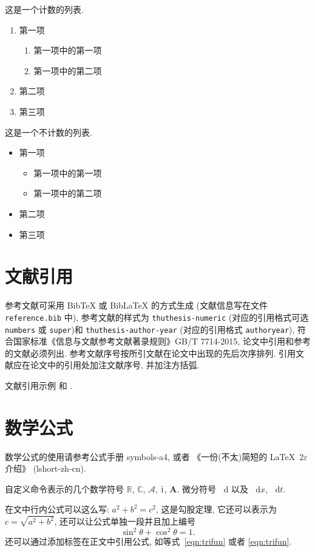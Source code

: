 \documentclass[UTF8,openany,twoside,12pt]{ctexbook}
\theoremstyle{plain}
\newcommand{\dif}{\mathop{}\!\mathrm{d}}
\newcommand{\CC}{\ensuremath{\mathbb{C}}}
\newcommand{\RR}{\ensuremath{\mathbb{R}}}
\newcommand{\dx}[1][x]{\mathop{}\!\mathrm{d}#1}
\newcommand{\ii}{\mathrm{i}\mkern1mu} %
\newcommand{\A}{\mathcal{A}}
\newcommand{\bA}{\boldsymbol{A}}
\begin{document}
这是一个计数的列表.
\begin{enumerate}%
	\item 第一项
		\begin{enumerate}
			\item 第一项中的第一项
			\item 第一项中的第二项
		\end{enumerate}
	\item 第二项
	\item 第三项
\end{enumerate}

这是一个不计数的列表.
\begin{itemize}%
	\item 第一项
	\begin{itemize}
		\item 第一项中的第一项
		\item 第一项中的第二项
	\end{itemize}
	\item 第二项
	\item 第三项
\end{itemize}


\section{文献引用}

参考文献可采用 BibTeX 或 BibLaTeX 的方式生成 (文献信息写在文件 \verb|reference.bib| 中), 参考文献的样式为 \verb|thuthesis-numeric| (对应的引用格式可选 \verb|numbers| 或  \verb|super|)和 \verb|thuthesis-author-year| (对应的引用格式 \verb|authoryear|), 符合国家标准《信息与文献参考文献著录规则》GB/T 7714-2015, 论文中引用和参考的文献必须列出. 参考文献序号按所引文献在论文中出现的先后次序排列. 引用文献应在论文中的引用处加注文献序号, 并加注方括弧.

文献引用示例 \cite{LiLiu1997} 和 \cite{Adams2003,Shen1994}.


\section{数学公式}

数学公式的使用请参考公式手册 symbols-a4, 或者 《一份(不太)简短的 \LaTeX~2$\varepsilon$ 介绍》 (lshort-zh-cn).

自定义命令表示的几个数学符号 $\RR$, $\CC$, $\A$, $\ii$, $\bA$. 微分符号 $\dif$ 以及 $\dx$, $\dx[t]$.

在文中行内公式可以这么写: $a^2+b^2=c^2$, 这是勾股定理, 它还可以表示为 $c=\sqrt{a^2+b^2}$, 还可以让公式单独一段并且加上编号
\begin{equation}\label{eqn:trifun}
\sin^2{\theta}+\cos^2{\theta}=1.
\end{equation}
还可以通过添加标签在正文中引用公式, 如等式~\eqref{eqn:trifun} 或者 \ref{eqn:trifun}.
\end{document}

